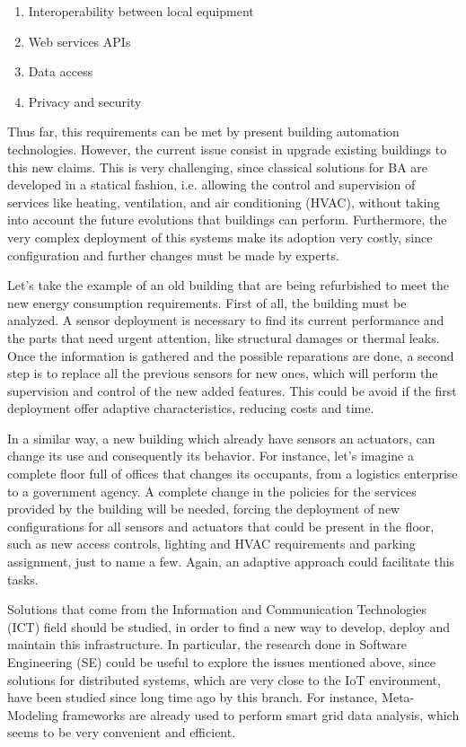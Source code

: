 \begin{enumerate}
	\item Interoperability between local equipment
	\item Web services APIs
	\item Data access
	\item Privacy and security
\end{enumerate}

Thus far, this requirements can be met by present building automation technologies.
However, the current issue consist in upgrade existing buildings to this new claims.
This is very challenging, since classical solutions for BA are developed in a statical fashion, i.e. allowing the control and supervision of services like heating, ventilation, and air conditioning (HVAC), without taking into account the future evolutions that buildings can perform.
Furthermore, the very complex deployment of this systems make its adoption very costly, since configuration and further changes must be made by experts.

Let's take the example of an old building that are being refurbished to meet the new energy consumption requirements.
First of all, the building must be analyzed.
A sensor deployment is necessary to find its current performance and the parts that need urgent attention, like structural damages or thermal leaks.
Once the information is gathered and the possible reparations are done, a second step is to replace all the previous sensors for new ones, which will perform the supervision and control of the new added features.
This could be avoid if the first deployment offer adaptive characteristics, reducing costs and time.

In a similar way, a new building which already have sensors an actuators, can change its use and consequently its behavior.
For instance, let's imagine a complete floor full of offices that changes its occupants, from a logistics enterprise to a government agency.
A complete change in the policies for the services provided by the building will be needed, forcing the deployment of new configurations for all sensors and actuators that could be present in the floor, such as new access controls, lighting and HVAC requirements and parking assignment, just to name a few.
Again, an adaptive approach could facilitate this tasks.

Solutions that come from the Information and Communication Technologies (ICT) field should be studied, in order to find a new way to develop, deploy and maintain this infrastructure.
In particular, the research done in Software Engineering (SE) could be useful to explore the issues mentioned above, since solutions for distributed systems, which are very close to the IoT environment, have been studied since long time ago by this branch.
For instance, Meta-Modeling frameworks are already used to perform smart grid data analysis\cite{hartmann2014realisticsmartgrid}, which seems to be very convenient and efficient.



